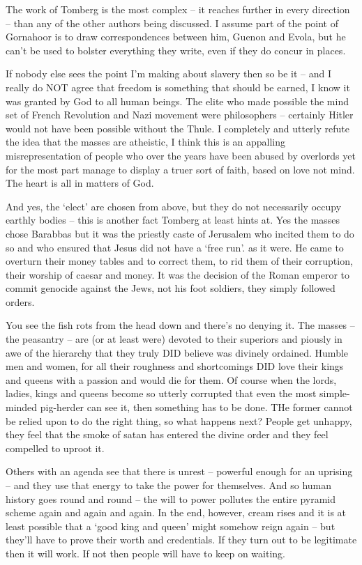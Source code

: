 \begin{footnotesize}
\begin{sffamily}
The work of Tomberg is the most complex – it reaches further in every direction – than any of the other authors being discussed. I assume part of the point of Gornahoor is to draw correspondences between him, Guenon and Evola, but he can't be used to bolster everything they write, even if they do concur in places. 

If nobody else sees the point I'm making about slavery then so be it – and I really do NOT agree that freedom is something that should be earned, I know it was granted by God to all human beings. The elite who made possible the mind set of French Revolution and Nazi movement were philosophers – certainly Hitler would not have been possible without the Thule. I completely and utterly refute the idea that the masses are atheistic, I think this is an appalling misrepresentation of people who over the years have been abused by overlords yet for the most part manage to display a truer sort of faith, based on love not mind. The heart is all in matters of God. 

And yes, the `elect' are chosen from above, but they do not necessarily occupy earthly bodies – this is another fact Tomberg at least hints at. Yes the masses chose Barabbas but it was the priestly caste of Jerusalem who incited them to do so and who ensured that Jesus did not have a `free run'. as it were. He came to overturn their money tables and to correct them, to rid them of their corruption, their worship of caesar and money. It was the decision of the Roman emperor to commit genocide against the Jews, not his foot soldiers, they simply followed orders. 

You see the fish rots from the head down and there's no denying it. The masses – the peasantry – are (or at least were) devoted to their superiors and piously in awe of the hierarchy that they truly DID believe was divinely ordained. Humble men and women, for all their roughness and shortcomings DID love their kings and queens with a passion and would die for them. Of course when the lords, ladies, kings and queens become so utterly corrupted that even the most simple-minded pig-herder can see it, then something has to be done. THe former cannot be relied upon to do the right thing, so what happens next? People get unhappy, they feel that the smoke of satan has entered the divine order and they feel compelled to uproot it.

Others with an agenda see that there is unrest – powerful enough for an uprising – and they use that energy to take the power for themselves. And so human history goes round and round – the will to power pollutes the entire pyramid scheme again and again and again. In the end, however, cream rises and it is at least possible that a `good king and queen' might somehow reign again – but they'll have to prove their worth and credentials. If they turn out to be legitimate then it will work. If not then people will have to keep on waiting.


\end{sffamily}
\end{footnotesize}
